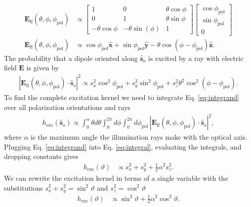 \documentclass{osa-article}
\providecommand{\mb}[1]{\mathbf{#1}}
\providecommand{\so}{\mathbf{\hat{s}}_o}
\providecommand{\mh}[1]{\mathbf{\hat{#1}}}
\begin{document}
\begin{align}
  \mb{E}_{\text{ff}}(\theta, \phi, \phi_{\text{pol}}) & \propto 
  \begin{bmatrix}
    1 & 0 &\theta \cos\phi\\
    0 & 1 &\theta \sin\phi\\
    -\theta\cos\phi&-\theta \sin(\phi)&1
  \end{bmatrix}
  \begin{bmatrix}
    \cos\phi_{\text{pol}}\\
    \sin\phi_{\text{pol}}\\
    0
  \end{bmatrix}\\
  \mb{E}_{\text{ff}}(\theta, \phi, \phi_{\text{pol}}) &\propto \cos\phi_{\text{pol}}\mh{x} + \sin\phi_{\text{pol}}\mh{y} - \theta\cos(\phi - \phi_{\text{pol}})\mh{z}.\label{eq:eff}
\end{align}
The probability that a dipole oriented along $\so{}$ is excited by a ray with
electric field $\mb{E}$ is given by 
\begin{align}
  |\mb{E}_{\text{ff}}(\theta, \phi, \phi_{\text{pol}}) \cdot \so{}|^2 \propto s_x^2\cos^2\phi_{\text{pol}} + s_y^2\sin^2\phi_{\text{pol}} + s_z^2\theta^2\cos^2(\phi - \phi_{\text{pol}}). \label{eq:integrand}
\end{align}
To find the complete excitation kernel we need to integrate Eq.
\ref{eq:integrand} over all polarization orientations and rays
\begin{align}
  h_{\text{exc}}(\so{}) \propto \int_0^{\alpha}\theta d\theta\int_0^{2\pi}d\phi\int_0^{2\pi}d\phi_{\text{pol}}\, |\mb{E}_{\text{ff}}(\theta, \phi, \phi_{\text{pol}}) \cdot \so{}|^2, \label{eq:integral}
\end{align}
where $\alpha$ is the maximum angle the illumination rays make with the optical
axis. Plugging Eq. \ref{eq:integrand} into Eq. \ref{eq:integral}, evaluating the
integrals, and dropping constants gives
\begin{align}
  h_{\text{exc}}(\vartheta) &\propto s_x^2 + s_y^2 + \frac{1}{2}\alpha^2s_z^2.
\end{align}
We can rewrite the excitation kernel in terms of a single variable with the
substitutions $s_x^2 + s_y^2 = \sin^2\vartheta$ and $s_z^2 = \cos^2\vartheta$
\begin{align}
  h_{\text{exc}}(\vartheta) &\propto \sin^2\vartheta + \frac{1}{2}\alpha^2\cos^2\vartheta \label{eq:hexctheta}.
\end{align}
\end{document}
